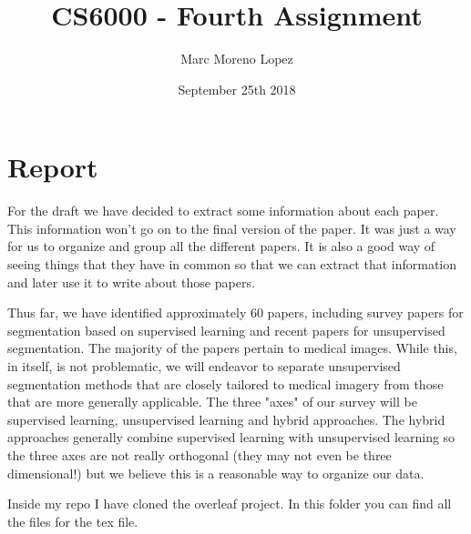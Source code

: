 \documentclass{article}
\title{CS6000 - Fourth Assignment}
\author{Marc Moreno Lopez}
\date{September 25th 2018}
\begin{document}
\maketitle

\section{Report}


For the draft we have decided to extract some information about each paper. This information won't go on to the final version of the paper. It was just a way for us to organize and group all the different papers. It is also a good way of seeing things that they have in common so that we can extract that information and later use it to write about those papers. 

Thus far, we have identified approximately 60 papers, including survey papers for segmentation based on supervised learning and recent papers for unsupervised segmentation. The majority of the papers pertain to medical images. While this, in itself, is not problematic, we will endeavor to separate unsupervised segmentation methods that are closely tailored to medical imagery from those that are more generally applicable. The three "axes" of our survey will be supervised learning, unsupervised learning and hybrid approaches. The hybrid approaches generally combine supervised learning with unsupervised learning so the three axes are not really orthogonal (they may not even be three dimensional!) but we believe this is a reasonable way to organize our data.

Inside my repo I have cloned the overleaf project. In this folder you can find all the files for the tex file.
\end{document}
